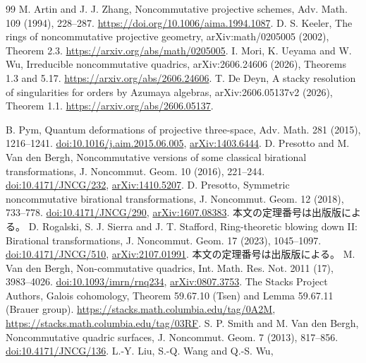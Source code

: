 \documentclass[11pt,a4paper]{ltjsarticle}
\theoremstyle{definition}
\begin{document}
\begin{thebibliography}{99}
 M. Artin and J. J. Zhang,
Noncommutative projective schemes, Adv. Math. 109 (1994), 228--287.
\url{https://doi.org/10.1006/aima.1994.1087}.
 D. S. Keeler,
The rings of noncommutative projective geometry,
arXiv:math/0205005 (2002), Theorem 2.3.
\url{https://arxiv.org/abs/math/0205005}.
 I. Mori, K. Ueyama and W. Wu,
Irreducible noncommutative quadrics, arXiv:2606.24606 (2026),
Theorems 1.3 and 5.17.
\url{https://arxiv.org/abs/2606.24606}.
 T. De Deyn,
A stacky resolution of singularities for orders by Azumaya algebras,
arXiv:2606.05137v2 (2026), Theorem 1.1.
\url{https://arxiv.org/abs/2606.05137}.


 B. Pym,
Quantum deformations of projective three-space,
Adv. Math. 281 (2015), 1216--1241.
\href{https://doi.org/10.1016/j.aim.2015.06.005}{doi:10.1016/j.aim.2015.06.005},
\href{https://arxiv.org/abs/1403.6444}{arXiv:1403.6444}.
 D. Presotto and M. Van den Bergh,
Noncommutative versions of some classical birational transformations,
J. Noncommut. Geom. 10 (2016), 221--244.
\href{https://doi.org/10.4171/JNCG/232}{doi:10.4171/JNCG/232},
\href{https://arxiv.org/abs/1410.5207}{arXiv:1410.5207}.
 D. Presotto,
Symmetric noncommutative birational transformations,
J. Noncommut. Geom. 12 (2018), 733--778.
\href{https://doi.org/10.4171/JNCG/290}{doi:10.4171/JNCG/290},
\href{https://arxiv.org/abs/1607.08383}{arXiv:1607.08383}.
本文の定理番号は出版版による。
 D. Rogalski, S. J. Sierra and J. T. Stafford,
Ring-theoretic blowing down II: Birational transformations,
J. Noncommut. Geom. 17 (2023), 1045--1097.
\href{https://doi.org/10.4171/JNCG/510}{doi:10.4171/JNCG/510},
\href{https://arxiv.org/abs/2107.01991}{arXiv:2107.01991}.
本文の定理番号は出版版による。
 M. Van den Bergh,
Non-commutative quadrics, Int. Math. Res. Not. 2011 (17), 3983--4026.
\href{https://doi.org/10.1093/imrn/rnq234}{doi:10.1093/imrn/rnq234},
\href{https://arxiv.org/abs/0807.3753}{arXiv:0807.3753}.
 The Stacks Project Authors,
Galois cohomology, Theorem 59.67.10 (Tsen) and Lemma 59.67.11 (Brauer group).
\url{https://stacks.math.columbia.edu/tag/0A2M},
\url{https://stacks.math.columbia.edu/tag/03RF}.
 S. P. Smith and M. Van den Bergh,
Noncommutative quadric surfaces, J. Noncommut. Geom. 7 (2013), 817--856.
\href{https://doi.org/10.4171/JNCG/136}{doi:10.4171/JNCG/136}.
 L.-Y. Liu, S.-Q. Wang and Q.-S. Wu,

\end{thebibliography}
\end{document}
